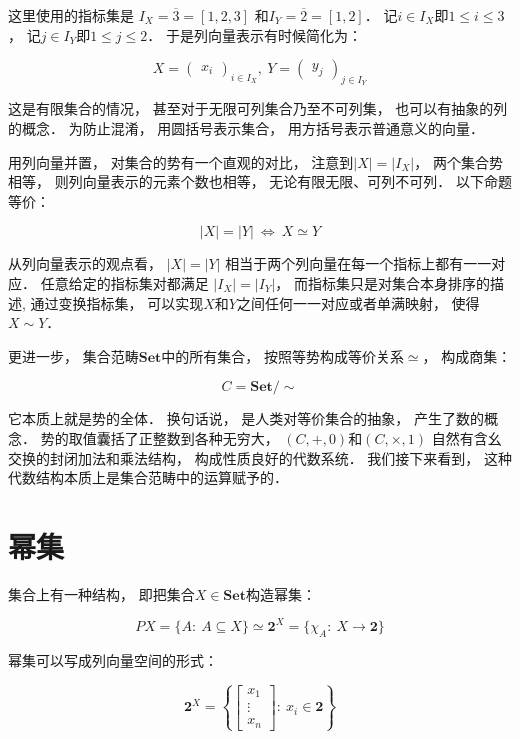 \documentclass[10pt, openany]{book}
\begin{document}
这里使用的指标集是
$I_X = \overline 3 = [1,2,3]$
和$I_Y = \overline 2 = [1,2]$．
记$i\in I_X$即$1 \leq i \leq 3$，
记$j\in I_Y$即$1 \leq j \leq 2$．
于是列向量表示有时候简化为：

$$
X=\begin{pmatrix}x_i\end{pmatrix}_{i \in I_X},\ 
Y=\begin{pmatrix}y_j\end{pmatrix}_{j \in I_Y}
$$

这是有限集合的情况，
甚至对于无限可列集合乃至不可列集，
也可以有抽象的列的概念．
为防止混淆，
用圆括号表示集合，
用方括号表示普通意义的向量．

用列向量并置，
对集合的势有一个直观的对比，
注意到$|X| = |I_X|$，
两个集合势相等，
则列向量表示的元素个数也相等，
无论有限无限、可列不可列．
以下命题等价：

$$
|X| = |Y| \ \Longleftrightarrow \  X \simeq Y
$$

从列向量表示的观点看，
$|X| = |Y|$
相当于两个列向量在每一个指标上都有一一对应．
任意给定的指标集对都满足
$|I_X| = |I_Y|$，
而指标集只是对集合本身排序的描述,
通过变换指标集，
可以实现$X$和$Y$之间任何一一对应或者单满映射，
使得$X \sim Y$．

更进一步，
集合范畴$\mathbf{Set}$中的所有集合，
按照等势构成等价关系$\simeq$，
构成商集：

$$
C = \mathbf{Set}/\sim
$$

它本质上就是势的全体．
换句话说，
是人类对等价集合的抽象，
产生了数的概念．
势的取值囊括了正整数到各种无穷大，
$(C,+,0)$和$(C,\times,1)$
自然有含幺交换的封闭加法和乘法结构，
构成性质良好的代数系统．
我们接下来看到，
这种代数结构本质上是集合范畴中的运算赋予的．

\section{幂集}

集合上有一种结构，
即把集合$X\in\textbf{Set}$构造幂集：

$$
PX = \{ A: \ A \subseteq X \}
\simeq \textbf{2}^X = \{ \chi_A: \ X \to \textbf{2} \}
$$

幂集可以写成列向量空间的形式：

$$
\textbf{2}^X = \left\{
\begin{bmatrix}
x_1 \\ \vdots \\ x_n    
\end{bmatrix}
:\ x_i \in \textbf{2}
\right\}
$$
\end{document}
